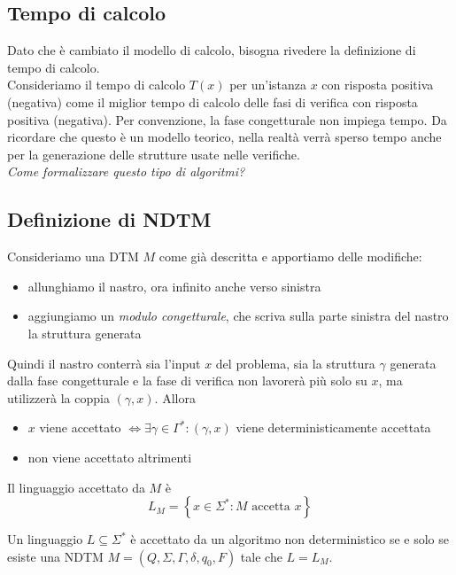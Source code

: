 \subsection{Tempo di calcolo}

Dato che è cambiato il modello di calcolo, bisogna rivedere la definizione di tempo di calcolo.\\

Consideriamo il tempo di calcolo $T(x)$ per un'istanza $x$ con risposta positiva (negativa) come il miglior tempo di calcolo delle fasi di verifica con risposta positiva (negativa). Per convenzione, la fase congetturale non impiega tempo. Da ricordare che questo è un modello teorico, nella realtà verrà sperso tempo anche per la generazione delle strutture usate nelle verifiche.\\

\textit{Come formalizzare questo tipo di algoritmi?} \\

\subsection{Definizione di NDTM}

Consideriamo una DTM $M$ come già descritta e apportiamo delle modifiche: 
\begin{itemize}
	\item allunghiamo il nastro, ora infinito anche verso sinistra
	\item aggiungiamo un \textit{modulo congetturale}, che scriva sulla parte sinistra del nastro la struttura generata
\end{itemize}

Quindi il nastro conterrà sia l'input $x$ del problema, sia la struttura $\gamma$ generata dalla fase congetturale e la fase di verifica non lavorerà più solo su $x$, ma utilizzerà la coppia $(\gamma, x)$. Allora 
\begin{itemize}
	\item $x$ viene accettato $\Leftrightarrow \exists \gamma \in \Gamma^\ast: (\gamma, x)$ viene deterministicamente accettata
	\item non viene accettato altrimenti 
\end{itemize}

Il linguaggio accettato da $M$ è 
$$ L_M = \left\{x \in \Sigma^\ast: M \text{ accetta } x\right\} $$

Un linguaggio $L \subseteq \Sigma^\ast$ è accettato da un algoritmo non deterministico se e solo se esiste una NDTM $M = (Q, \Sigma, \Gamma, \delta, q_0, F)$ tale che $L = L_M$.\\

